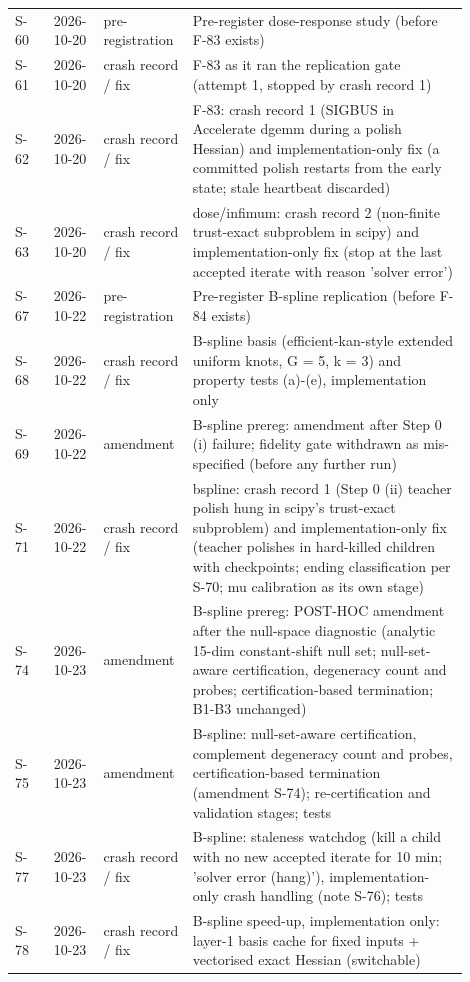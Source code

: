 {\begin{longtable}{R{0.08\linewidth} R{0.10\linewidth} R{0.14\linewidth} R{0.58\linewidth}}
S-60 & 2026-10-20 & pre-registration & Pre-register dose-response study (before F-83 exists) \\
S-61 & 2026-10-20 & crash record / fix & F-83 as it ran the replication gate (attempt 1, stopped by crash record 1) \\
S-62 & 2026-10-20 & crash record / fix & F-83: crash record 1 (SIGBUS in Accelerate dgemm during a polish Hessian) and implementation-only fix (a committed polish restarts from the early state; stale heartbeat discarded) \\
S-63 & 2026-10-20 & crash record / fix & dose/infimum: crash record 2 (non-finite trust-exact subproblem in scipy) and implementation-only fix (stop at the last accepted iterate with reason 'solver error') \\
S-67 & 2026-10-22 & pre-registration & Pre-register B-spline replication (before F-84 exists) \\
S-68 & 2026-10-22 & crash record / fix & B-spline basis (efficient-kan-style extended uniform knots, G = 5, k = 3) and property tests (a)-(e), implementation only \\
S-69 & 2026-10-22 & amendment & B-spline prereg: amendment after Step 0 (i) failure; fidelity gate withdrawn as mis-specified (before any further run) \\
S-71 & 2026-10-22 & crash record / fix & bspline: crash record 1 (Step 0 (ii) teacher polish hung in scipy's trust-exact subproblem) and implementation-only fix (teacher polishes in hard-killed children with checkpoints; ending classification per S-70; mu calibration as its own stage) \\
S-74 & 2026-10-23 & amendment & B-spline prereg: POST-HOC amendment after the null-space diagnostic (analytic 15-dim constant-shift null set; null-set-aware certification, degeneracy count and probes; certification-based termination; B1-B3 unchanged) \\
S-75 & 2026-10-23 & amendment & B-spline: null-set-aware certification, complement degeneracy count and probes, certification-based termination (amendment S-74); re-certification and validation stages; tests \\
S-77 & 2026-10-23 & crash record / fix & B-spline: staleness watchdog (kill a child with no new accepted iterate for 10 min; 'solver error (hang)'), implementation-only crash handling (note S-76); tests \\
S-78 & 2026-10-23 & crash record / fix & B-spline speed-up, implementation only: layer-1 basis cache for fixed inputs + vectorised exact Hessian (switchable) \\

\end{longtable}}
